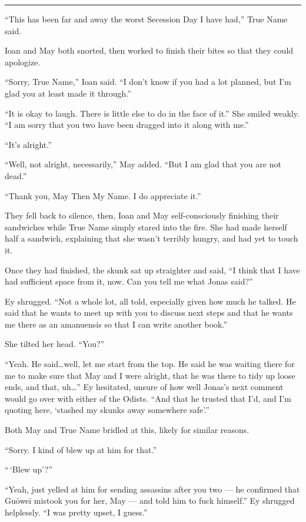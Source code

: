 \begin{center}\rule{0.5\linewidth}{0.5pt}\end{center}

``This has been far and away the worst Secession Day I have had,'' True Name said.

Ioan and May both snorted, then worked to finish their bites so that they could apologize.

``Sorry, True Name,'' Ioan said. ``I don't know if you had a lot planned, but I'm glad you at least made it through.''

``It is okay to laugh. There is little else to do in the face of it.'' She smiled weakly. ``I am sorry that you two have been dragged into it along with me.''

``It's alright.''

``Well, not alright, necessarily,'' May added. ``But I am glad that you are not dead.''

``Thank you, May Then My Name. I do appreciate it.''

They fell back to silence, then, Ioan and May self-consciously finishing their sandwiches while True Name simply stared into the fire. She had made herself half a sandwich, explaining that she wasn't terribly hungry, and had yet to touch it.

Once they had finished, the skunk sat up straighter and said, ``I think that I have had sufficient space from it, now. Can you tell me what Jonas said?''

Ey shrugged. ``Not a whole lot, all told, especially given how much he talked. He said that he wants to meet up with you to discuss next steps and that he wants me there as an amanuensis so that I can write another book.''

She tilted her head. ``You?''

``Yeah. He said\ldots well, let me start from the top. He said he was waiting there for me to make sure that May and I were alright, that he was there to tidy up loose ends, and that, uh\ldots{}'' Ey hesitated, unsure of how well Jonas's next comment would go over with either of the Odists. ``And that he trusted that I'd, and I'm quoting here, `stashed my skunks away somewhere safe'.''

Both May and True Name bridled at this, likely for similar reasons.

``Sorry. I kind of blew up at him for that.''

``\,`Blew up'?''

``Yeah, just yelled at him for sending assassins after you two — he confirmed that Guōweī mistook you for her, May — and told him to fuck himself.'' Ey shrugged helplessly. ``I was pretty upset, I guess.''

